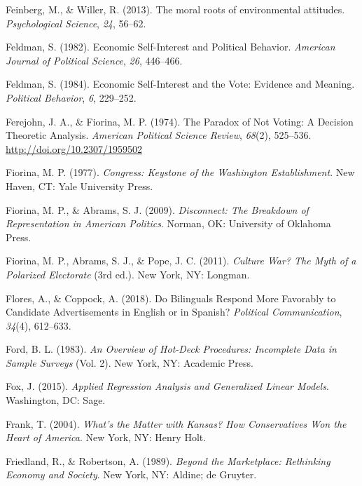 \documentclass[12pt,econ]{sources/authesis}
\begin{document}
\leavevmode\hypertarget{ref-feinberg_2013_moral}{}%
Feinberg, M., \& Willer, R. (2013). The moral roots of environmental attitudes. \emph{Psychological Science}, \emph{24}, 56--62.

\leavevmode\hypertarget{ref-feldman_economic_1982}{}%
Feldman, S. (1982). Economic Self-Interest and Political Behavior. \emph{American Journal of Political Science}, \emph{26}, 446--466.

\leavevmode\hypertarget{ref-feldman_economic_1984}{}%
Feldman, S. (1984). Economic Self-Interest and the Vote: Evidence and Meaning. \emph{Political Behavior}, \emph{6}, 229--252.

\leavevmode\hypertarget{ref-ferejohn_paradox_1974}{}%
Ferejohn, J. A., \& Fiorina, M. P. (1974). The Paradox of Not Voting: A Decision Theoretic Analysis. \emph{American Political Science Review}, \emph{68}(2), 525--536. \url{http://doi.org/10.2307/1959502}

\leavevmode\hypertarget{ref-fiorina_congress:_1977}{}%
Fiorina, M. P. (1977). \emph{Congress: Keystone of the Washington Establishment}. New Haven, CT: Yale University Press.

\leavevmode\hypertarget{ref-fiorina_disconnect_2009}{}%
Fiorina, M. P., \& Abrams, S. J. (2009). \emph{Disconnect: The Breakdown of Representation in American Politics}. Norman, OK: University of Oklahoma Press.

\leavevmode\hypertarget{ref-fiorina_culture_2011}{}%
Fiorina, M. P., Abrams, S. J., \& Pope, J. C. (2011). \emph{Culture War? The Myth of a Polarized Electorate} (3rd ed.). New York, NY: Longman.

\leavevmode\hypertarget{ref-flores_2018_bilinguals}{}%
Flores, A., \& Coppock, A. (2018). Do Bilinguals Respond More Favorably to Candidate Advertisements in English or in Spanish? \emph{Political Communication}, \emph{34}(4), 612--633.

\leavevmode\hypertarget{ref-ford_1983_overview}{}%
Ford, B. L. (1983). \emph{An Overview of Hot-Deck Procedures: Incomplete Data in Sample Surveys} (Vol. 2). New York, NY: Academic Press.

\leavevmode\hypertarget{ref-fox_applied_2015}{}%
Fox, J. (2015). \emph{Applied Regression Analysis and Generalized Linear Models}. Washington, DC: Sage.

\leavevmode\hypertarget{ref-frank_whats_2004}{}%
Frank, T. (2004). \emph{What's the Matter with Kansas? How Conservatives Won the Heart of America}. New York, NY: Henry Holt.

\leavevmode\hypertarget{ref-friedland_beyond_1989}{}%
Friedland, R., \& Robertson, A. (1989). \emph{Beyond the Marketplace: Rethinking Economy and Society}. New York, NY: Aldine; de Gruyter.
\end{document}
